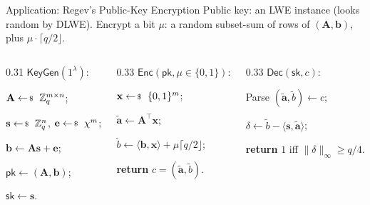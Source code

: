 \documentclass{zkdl-presentation-template}
\begin{document}
    \begin{frame}{Application: Regev's Public-Key Encryption}
        Public key: an LWE instance (looks random by DLWE). Encrypt a bit $\mu$: a random subset-sum of rows of $(\mathbf{A},\mathbf{b})$, plus $\mu \cdot \lceil q/2 \rfloor$.
        \pause

        \vspace{5pt}
        \footnotesize
        \begin{columns}[T]
            \begin{column}{0.31\textwidth}
                \colorbox{oc-blue-1}{$\mathsf{KeyGen}(1^{\lambda})$:}
                \begin{algoen}
                    \item $\mathbf{A} \leftarrowS \mathbb{Z}_q^{m \times n}$;
                    \item $\mathbf{s} \leftarrowS \mathbb{Z}_q^n$, $\mathbf{e} \leftarrowS \chi^m$;
                    \item $\mathbf{b} \gets \mathbf{A}\mathbf{s} + \mathbf{e}$;
                    \item $\mathsf{pk} \gets (\mathbf{A},\mathbf{b})$;
                    \item $\mathsf{sk} \gets \mathbf{s}$.
                \end{algoen}
            \end{column}
            \pause
            \begin{column}{0.33\textwidth}
                \colorbox{oc-blue-1}{$\mathsf{Enc}(\mathsf{pk}, \mu \in \{0,1\})$:}
                \begin{algoen}
                    \item $\mathbf{x} \leftarrowS \{0,1\}^m$;
                    \item $\widetilde{\mathbf{a}} \gets \mathbf{A}^{\top}\mathbf{x}$;
                    \item $\widetilde{b} \gets \langle \mathbf{b}, \mathbf{x} \rangle + \mu\lceil q/2 \rfloor$;
                    \item \textbf{return} $c=(\widetilde{\mathbf{a}}, \widetilde{b})$.
                \end{algoen}
            \end{column}
            \pause
            \begin{column}{0.33\textwidth}
                \colorbox{oc-blue-1}{$\mathsf{Dec}(\mathsf{sk}, c)$:}
                \begin{algoen}
                    \item Parse $(\widetilde{\mathbf{a}}, \widetilde{b}) \gets c$;
                    \item $\delta \gets \widetilde{b} - \langle \mathbf{s}, \widetilde{\mathbf{a}} \rangle$;
                    \item \textbf{return} $1$ iff $\|\delta\|_{\infty} \geq q/4$.
                \end{algoen}
            \end{column}
        \end{columns}
        \normalsize
        \vspace{5pt}


\end{frame}
\end{document}
